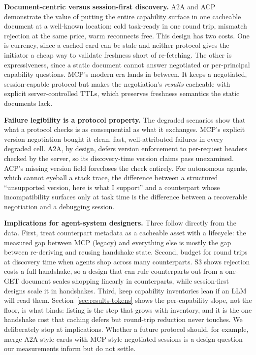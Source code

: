 \documentclass[10pt]{article}
\newcommand{\mcpl}{MCP (legacy)}
\begin{document}
\textbf{Document-centric versus session-first discovery.} A2A and ACP
demonstrate the value of putting the entire capability surface in one
cacheable document at a well-known location: cold task-ready in one round
trip, mismatch rejection at the same price, warm reconnects free. This
design has two costs. One is currency, since a cached card can be stale
and neither protocol gives the initiator a cheap way to validate
freshness short of re-fetching. The other is expressiveness, since a
static document cannot answer negotiated or per-principal capability
questions. MCP's modern era lands in between. It keeps a negotiated,
session-capable protocol but makes the negotiation's \emph{results}
cacheable with explicit server-controlled TTLs, which preserves freshness
semantics the static documents lack.

\textbf{Failure legibility is a protocol property.} The degraded
scenarios show that what a protocol checks is as consequential as what it
exchanges. MCP's explicit version negotiation bought it clean, fast,
well-attributed failures in every degraded cell. A2A, by design, defers
version enforcement to per-request headers checked by the server, so its
discovery-time version claims pass unexamined. ACP's missing version
field forecloses the check entirely. For autonomous agents, which cannot
eyeball a stack trace, the difference between a structured ``unsupported
version, here is what I support'' and a counterpart whose incompatibility
surfaces only at task time is the difference between a recoverable
negotiation and a debugging session.


\textbf{Implications for agent-system designers.} Three follow directly
from the data. First, treat counterpart metadata as a cacheable asset
with a lifecycle: the measured gap between \mcpl{} and everything else is
mostly the gap between re-deriving and reusing handshake state. Second,
budget for round trips at discovery time when agents shop across many
counterparts. S3 shows rejection costs a full handshake, so a design that
can rule counterparts out from a one-GET document scales shopping
linearly in counterparts, while session-first designs scale it in
handshakes. Third, keep capability inventories lean if an LLM will read
them. Section~\ref{sec:results-tokens} shows the per-capability slope,
not the floor, is what binds: listing is the step that grows with
inventory, and it is the one handshake cost that caching defers but
round-trip reduction never touches. We deliberately stop
at implications. Whether a future protocol should, for example, merge
A2A-style cards with MCP-style negotiated sessions is a design question
our measurements inform but do not settle.
\end{document}

